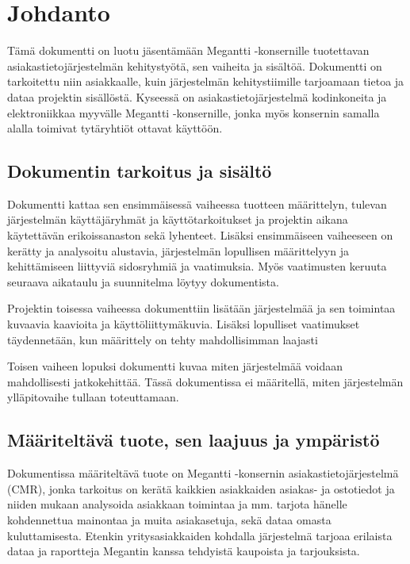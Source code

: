 \chapter{Johdanto} %
\label{johdanto} %
\thispagestyle{fancy} %


Tämä dokumentti on luotu jäsentämään Megantti -konsernille tuotettavan asiakastietojärjestelmän kehitystyötä, sen vaiheita ja 
sisältöä. Dokumentti on tarkoitettu niin asiakkaalle, kuin järjestelmän kehitystiimille tarjoamaan tietoa ja dataa projektin
sisällöstä. Kyseessä on asiakastietojärjestelmä kodinkoneita ja elektroniikkaa myyvälle Megantti -konsernille, jonka myös 
konsernin samalla alalla toimivat tytäryhtiöt ottavat käyttöön. 

\section{Dokumentin tarkoitus ja sisältö} 

    Dokumentti kattaa sen ensimmäisessä vaiheessa tuotteen määrittelyn, tulevan järjestelmän käyttäjäryhmät ja käyttötarkoitukset
    ja projektin aikana käytettävän erikoissanaston sekä lyhenteet. Lisäksi ensimmäiseen vaiheeseen on kerätty ja analysoitu alustavia,
    järjestelmän lopullisen määrittelyyn ja kehittämiseen liittyviä sidosryhmiä ja vaatimuksia. Myös vaatimusten keruuta seuraava
    aikataulu ja suunnitelma löytyy dokumentista.

    Projektin toisessa vaiheessa dokumenttiin lisätään järjestelmää ja sen toimintaa kuvaavia kaavioita ja käyttöliittymäkuvia. 
    Lisäksi lopulliset vaatimukset täyden\-netään, kun määrittely on tehty mahdollisimman laajasti

    Toisen vaiheen lopuksi dokumentti kuvaa miten järjestelmää voidaan mahdollisesti jatkokehittää.
    Tässä dokumentissa ei määritellä, miten järjestelmän ylläpitovaihe tullaan toteuttamaan.


\section{Määriteltävä tuote, sen laajuus ja ympäristö}

    Dokumentissa määriteltävä tuote on Megantti -konsernin asiakastietojärjestelmä (CMR), jonka tarkoitus on kerätä kaikkien asiakkaiden asiakas-
    ja ostotiedot ja niiden mukaan analysoida asiakkaan toimintaa ja mm. tarjota hänelle kohdennettua mainontaa ja muita asiakasetuja, 
    sekä dataa omasta kuluttamisesta. Etenkin yritysasiakkaiden kohdalla järjestelmä tarjoaa erilaista dataa ja raportteja Megantin 
    kanssa tehdyistä kaupoista ja tarjouksista. 

